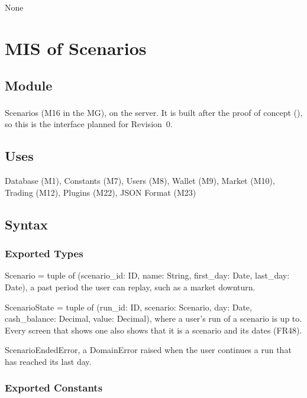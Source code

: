 \documentclass[12pt, titlepage]{article}
\begin{document}
None

\par\endgroup

\newpage

\section{MIS of Scenarios} \label{MisScenarios}

\begingroup\raggedright
\subsection{Module}

Scenarios (M16 in the MG), on the server. It is built after the proof of
concept (\textsuperscript{\dag}), so this is the interface planned for
Revision~0.

\subsection{Uses}

Database (M1), Constants (M7), Users (M8), Wallet (M9), Market (M10), Trading
(M12), Plugins (M22), JSON Format (M23)

\subsection{Syntax}

\subsubsection{Exported Types}

\noindent Scenario = tuple of (scenario\_id: ID, name: String, first\_day:
Date, last\_day: Date), a past period the user can replay, such as a market
downturn.

\medskip
\noindent ScenarioState = tuple of (run\_id: ID, scenario: Scenario, day:
Date, cash\_balance: Decimal, value: Decimal), where a user's run of a
scenario is up to. Every screen that shows one also shows that it is a
scenario and its dates (FR48).

\medskip
\noindent ScenarioEndedError, a DomainError raised when the user continues a
run that has reached its last day.

\subsubsection{Exported Constants}
\end{document}

